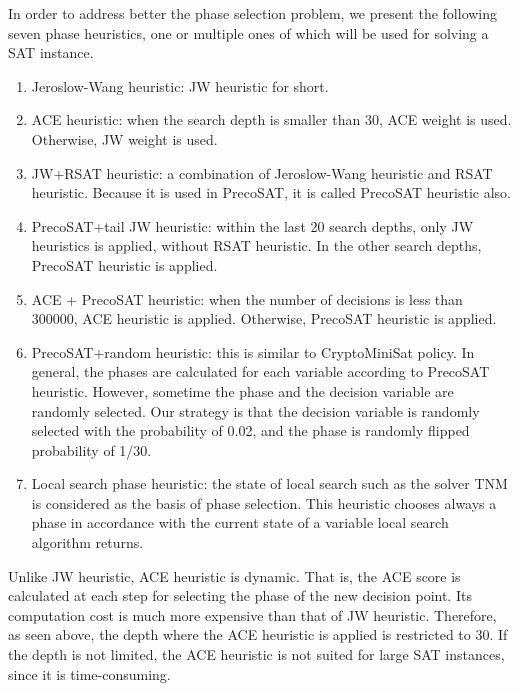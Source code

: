 \documentclass{llncs}
\begin{document}
 In order to address better the phase selection problem, we present
the following seven phase heuristics, one or multiple ones of which
will be used for solving a SAT instance.
\begin{enumerate}
\item Jeroslow-Wang heuristic: JW heuristic for short.

\item ACE heuristic: when the search depth is smaller than 30, ACE weight is used. Otherwise, JW
weight is used.

\item JW+RSAT heuristic: a combination of Jeroslow-Wang
heuristic and RSAT heuristic. Because it is used in PrecoSAT, it is
called PrecoSAT heuristic also.

\item PrecoSAT+tail JW heuristic: within the last 20 search depths, only JW heuristics is applied,
without RSAT heuristic. In the other search depths, PrecoSAT
heuristic is applied.

\item  ACE + PrecoSAT heuristic: when the number of decisions is less than 300000, ACE heuristic is applied.
Otherwise, PrecoSAT heuristic is applied.

\item PrecoSAT+random heuristic: this is similar to CryptoMiniSat \cite {CryptoMiniSat:12} policy. In general,
the phases are calculated for each variable according to PrecoSAT
heuristic. However, sometime the phase and the decision variable are
randomly selected. Our strategy is that the decision variable is
randomly selected with the probability of 0.02, and the phase is
randomly flipped probability of 1/30.

\item Local search phase heuristic: the state of local search such as the solver TNM \cite {TNM:20} is considered as
the basis of phase selection. This heuristic chooses always a phase
in accordance with the current state of a variable local search
algorithm returns.

\end{enumerate}

Unlike JW heuristic, ACE heuristic is dynamic. That is, the ACE
 score is calculated at each step for selecting the phase of the
new decision point. Its computation cost is much more expensive than
that of JW heuristic. Therefore, as seen above, the depth where the
ACE heuristic is applied is restricted to 30. If the depth is not
limited, the ACE heuristic is not suited for large SAT instances,
since it is time-consuming.
\end{document}
